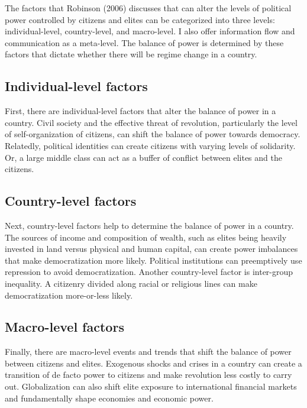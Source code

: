 \documentclass[12pt,]{article}
\begin{document}
The factors that Robinson (2006) discusses that can alter the levels of
political power controlled by citizens and elites can be categorized
into three levels: individual-level, country-level, and macro-level. I
also offer information flow and communication as a meta-level. The
balance of power is determined by these factors that dictate whether
there will be regime change in a country.

\hypertarget{individual-level-factors}{%
\subsection{Individual-level factors}\label{individual-level-factors}}

First, there are individual-level factors that alter the balance of
power in a country. Civil society and the effective threat of
revolution, particularly the level of self-organization of citizens, can
shift the balance of power towards democracy. Relatedly, political
identities can create citizens with varying levels of solidarity. Or, a
large middle class can act as a buffer of conflict between elites and
the citizens.

\hypertarget{country-level-factors}{%
\subsection{Country-level factors}\label{country-level-factors}}

Next, country-level factors help to determine the balance of power in a
country. The sources of income and composition of wealth, such as elites
being heavily invested in land versus physical and human capital, can
create power imbalances that make democratization more likely. Political
institutions can preemptively use repression to avoid democratization.
Another country-level factor is inter-group inequality. A citizenry
divided along racial or religious lines can make democratization
more-or-less likely.

\hypertarget{macro-level-factors}{%
\subsection{Macro-level factors}\label{macro-level-factors}}

Finally, there are macro-level events and trends that shift the balance
of power between citizens and elites. Exogenous shocks and crises in a
country can create a transition of de facto power to citizens and make
revolution less costly to carry out. Globalization can also shift elite
exposure to international financial markets and fundamentally shape
economies and economic power.
\end{document}
